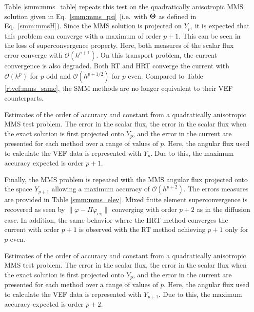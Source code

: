 \documentclass[../doc.tex]{subfiles}
\begin{document}
Table \ref{smm:mms_table} repeats this test on the quadratically anisotropic MMS solution given in Eq.~\ref{smm:mms_psi} (i.e.~with $\boldsymbol{\mathrm{\Theta}}$ as defined in Eq.~\ref{smm:mmsH}). Since the MMS solution is projected on $Y_p$, it is expected that this problem can converge with a maximum of order $p+1$. This can be seen in the loss of superconvergence property. Here, both measures of the scalar flux error converge with $\mathcal{O}(h^{p+1})$. On this transport problem, the current convergence is also degraded. Both RT and HRT converge the current with $\mathcal{O}(h^p)$ for $p$ odd and $\mathcal{O}(h^{p+1/2})$ for $p$ even. Compared to Table \ref{rtvef:mms_same}, the SMM methods are no longer equivalent to their VEF counterparts. 
\begin{table}
\centering
\caption{Estimates of the order of accuracy and constant from a quadratically anisotropic MMS test problem. The error in the scalar flux, the error in the scalar flux when the exact solution is first projected onto $Y_p$, and the error in the current are presented for each method over a range of values of $p$. Here, the angular flux used to calculate the VEF data is represented with $Y_p$. Due to this, the maximum accuracy expected is order $p+1$. }
\label{smm:mms_table}

\end{table}

Finally, the MMS problem is repeated with the MMS angular flux projected onto the space $Y_{p+1}$ allowing a maximum accuracy of $\mathcal{O}(h^{p+2})$. The errors measures are provided in Table \ref{smm:mms_elev}. Mixed finite element superconvergence is recovered as seen by $\|\varphi - \Pi \varphi_\text{ex}\|$ converging with order $p+2$ as in the diffusion case. In addition, the same behavior where the HRT method converges the current with order $p+1$ is observed with the RT method achieving $p+1$ only for $p$ even. 
\begin{table}
\centering
\caption{Estimates of the order of accuracy and constant from a quadratically anisotropic MMS test problem. The error in the scalar flux, the error in the scalar flux when the exact solution is first projected onto $Y_p$, and the error in the current are presented for each method over a range of values of $p$. Here, the angular flux used to calculate the VEF data is represented with $Y_{p+1}$. Due to this, the maximum accuracy expected is order $p+2$.}
\label{smm:mms_elev}

\end{table}
\end{document}
